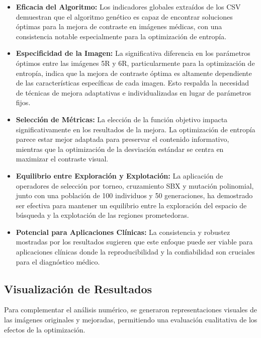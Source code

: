 \begin{itemize}
    \item \textbf{Eficacia del Algoritmo:} Los indicadores globales extraídos de los CSV demuestran que el algoritmo genético es capaz de encontrar soluciones óptimas para la mejora de contraste en imágenes médicas, con una consistencia notable especialmente para la optimización de entropía.

    \item \textbf{Especificidad de la Imagen:} La significativa diferencia en los parámetros óptimos entre las imágenes 5R y 6R, particularmente para la optimización de entropía, indica que la mejora de contraste óptima es altamente dependiente de las características específicas de cada imagen. Esto respalda la necesidad de técnicas de mejora adaptativas e individualizadas en lugar de parámetros fijos.

    \item \textbf{Selección de Métricas:} La elección de la función objetivo impacta significativamente en los resultados de la mejora. La optimización de entropía parece estar mejor adaptada para preservar el contenido informativo, mientras que la optimización de la desviación estándar se centra en maximizar el contraste visual.

    \item \textbf{Equilibrio entre Exploración y Explotación:} La aplicación de operadores de selección por torneo, cruzamiento SBX y mutación polinomial, junto con una población de 100 individuos y 50 generaciones, ha demostrado ser efectiva para mantener un equilibrio entre la exploración del espacio de búsqueda y la explotación de las regiones prometedoras.

    \item \textbf{Potencial para Aplicaciones Clínicas:} La consistencia y robustez mostradas por los resultados sugieren que este enfoque puede ser viable para aplicaciones clínicas donde la reproducibilidad y la confiabilidad son cruciales para el diagnóstico médico.
\end{itemize}

\subsection{Visualización de Resultados}
Para complementar el análisis numérico, se generaron representaciones visuales de las imágenes originales y mejoradas, permitiendo una evaluación cualitativa de los efectos de la optimización.

